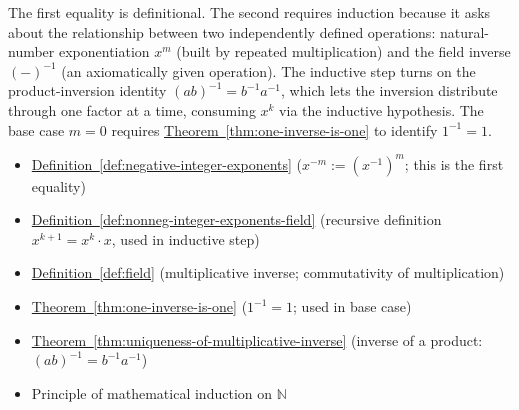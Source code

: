 \begin{remark*}
The first equality is definitional.  The second requires induction because
it asks about the relationship between two independently defined operations:
natural-number exponentiation $x^m$ (built by repeated multiplication) and
the field inverse $(-)^{-1}$ (an axiomatically given operation).  The inductive
step turns on the product-inversion identity $(ab)^{-1} = b^{-1}a^{-1}$, which
lets the inversion distribute through one factor at a time, consuming $x^k$
via the inductive hypothesis.  The base case $m=0$ requires
\hyperref[thm:one-inverse-is-one]{Theorem~\ref*{thm:one-inverse-is-one}} to
identify $1^{-1} = 1$.
\end{remark*}

\begin{dependencies}
\begin{itemize}
  \item \hyperref[def:negative-integer-exponents]{Definition~\ref*{def:negative-integer-exponents}}
        \textnormal{($x^{-m} := (x^{-1})^m$; this is the first equality)}
  \item \hyperref[def:nonneg-integer-exponents-field]{Definition~\ref*{def:nonneg-integer-exponents-field}}
        \textnormal{(recursive definition $x^{k+1} = x^k\cdot x$, used in inductive step)}
  \item \hyperref[def:field]{Definition~\ref*{def:field}}
        \textnormal{(multiplicative inverse; commutativity of multiplication)}
  \item \hyperref[thm:one-inverse-is-one]{Theorem~\ref*{thm:one-inverse-is-one}}
        \textnormal{($1^{-1} = 1$; used in base case)}
  \item \hyperref[thm:uniqueness-of-multiplicative-inverse]{Theorem~\ref*{thm:uniqueness-of-multiplicative-inverse}}
        \textnormal{(inverse of a product: $(ab)^{-1} = b^{-1}a^{-1}$)}
  \item Principle of mathematical induction on $\mathbb{N}$
\end{itemize}
\end{dependencies}

\clearpage
